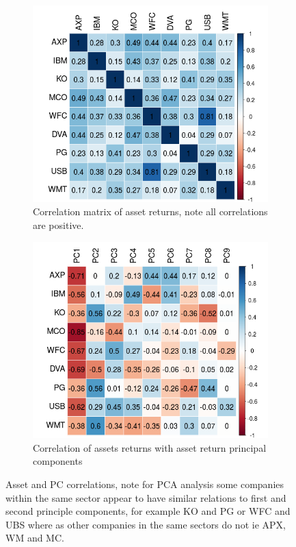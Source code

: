 \documentclass[10pt]{article_simple}
\begin{document}
\begin{figure}[H]
	\centering
	\begin{subfigure}{.45\textwidth}
  	\centering
  	\includegraphics[width=.9\linewidth]{Correlation_Matrix}
  	\caption{Correlation matrix of asset returns, note all correlations are positive.}
    \label{fig:sub1}
	\end{subfigure}%
		\hspace{1em}
	\begin{subfigure}{.45\textwidth}
  	\centering
  	\includegraphics[width=.9\linewidth]{Correlation_Matrix_top_Right}
  	\caption{Correlation of assets returns with asset return principal components}
 	\label{fig:sub2}
	\end{subfigure}
	\caption{Asset and PC correlations, note for PCA analysis some companies within the same sector appear to have similar relations to first and second principle components, for example KO and PG or WFC and UBS where as other companies in the same sectors do not ie APX, WM and MC.}
\end{figure}
\end{document}
